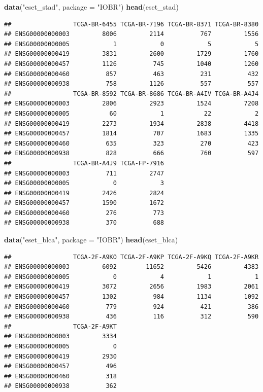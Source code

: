 \documentclass[
  12pt,
]{book}
\newenvironment{Shaded}{\begin{snugshade}}{\end{snugshade}}
\newcommand{\AttributeTok}[1]{\textcolor[rgb]{0.13,0.29,0.53}{#1}}
\newcommand{\FunctionTok}[1]{\textcolor[rgb]{0.13,0.29,0.53}{\textbf{#1}}}
\newcommand{\NormalTok}[1]{#1}
\newcommand{\StringTok}[1]{\textcolor[rgb]{0.31,0.60,0.02}{#1}}
\begin{document}
\begin{Shaded}
\begin{Highlighting}[]
\FunctionTok{data}\NormalTok{(}\StringTok{"eset\_stad"}\NormalTok{, }\AttributeTok{package =} \StringTok{"IOBR"}\NormalTok{)}
\FunctionTok{head}\NormalTok{(eset\_stad)}
\end{Highlighting}
\end{Shaded}

\begin{verbatim}
##                 TCGA-BR-6455 TCGA-BR-7196 TCGA-BR-8371 TCGA-BR-8380
## ENSG00000000003         8006         2114          767         1556
## ENSG00000000005            1            0            5            5
## ENSG00000000419         3831         2600         1729         1760
## ENSG00000000457         1126          745         1040         1260
## ENSG00000000460          857          463          231          432
## ENSG00000000938          758         1126          557          557
##                 TCGA-BR-8592 TCGA-BR-8686 TCGA-BR-A4IV TCGA-BR-A4J4
## ENSG00000000003         2806         2923         1524         7208
## ENSG00000000005           60            1           22            2
## ENSG00000000419         2273         1934         2838         4418
## ENSG00000000457         1814          707         1683         1335
## ENSG00000000460          635          323          270          423
## ENSG00000000938          828          666          760          597
##                 TCGA-BR-A4J9 TCGA-FP-7916
## ENSG00000000003          711         2747
## ENSG00000000005            0            3
## ENSG00000000419         2426         2824
## ENSG00000000457         1590         1672
## ENSG00000000460          276          773
## ENSG00000000938          370          688
\end{verbatim}

\begin{Shaded}
\begin{Highlighting}[]
\FunctionTok{data}\NormalTok{(}\StringTok{"eset\_blca"}\NormalTok{, }\AttributeTok{package =} \StringTok{"IOBR"}\NormalTok{)}
\FunctionTok{head}\NormalTok{(eset\_blca)}
\end{Highlighting}
\end{Shaded}

\begin{verbatim}
##                 TCGA-2F-A9KO TCGA-2F-A9KP TCGA-2F-A9KQ TCGA-2F-A9KR
## ENSG00000000003         6092        11652         5426         4383
## ENSG00000000005            0            4            1            1
## ENSG00000000419         3072         2656         1983         2061
## ENSG00000000457         1302          984         1134         1092
## ENSG00000000460          779          924          421          386
## ENSG00000000938          436          116          312          590
##                 TCGA-2F-A9KT
## ENSG00000000003         3334
## ENSG00000000005            0
## ENSG00000000419         2930
## ENSG00000000457          496
## ENSG00000000460          318
## ENSG00000000938          362
\end{verbatim}
\end{document}
